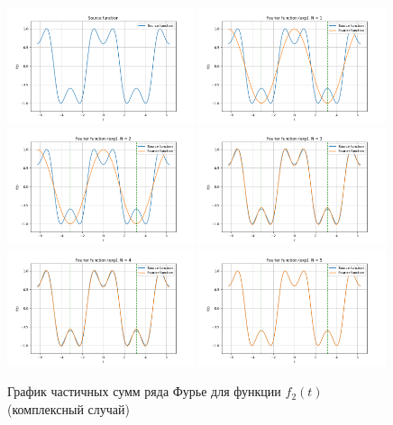 \begin{figure}[ht!]
    \centering
    \includegraphics[width=0.49\textwidth]{media/plots/func_2_exp.png}
    \includegraphics[width=0.49\textwidth]{media/plots/func_2_exp_N_1.png}
    \includegraphics[width=0.49\textwidth]{media/plots/func_2_exp_N_2.png}
    \includegraphics[width=0.49\textwidth]{media/plots/func_2_exp_N_3.png}
    \includegraphics[width=0.49\textwidth]{media/plots/func_2_exp_N_4.png}
    \includegraphics[width=0.49\textwidth]{media/plots/func_2_exp_N_5.png}
    \caption{График частичных сумм ряда Фурье для функции $f_2(t)$ (комплексный случай)}
    \label{fig:func_2_plot_exp}
\end{figure}

